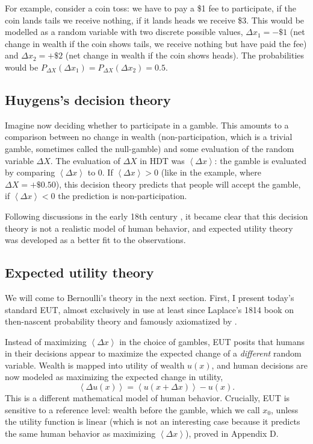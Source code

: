\documentclass[final]{ectaart}
\newcommand{\ave}[1]{\left\langle#1 \right\rangle}
\newcommand{\elabel}[1]{\label{eq:#1}}
\newcommand{\be}{\begin{equation}}
\newcommand{\ee}{\end{equation}}
\newcommand{\Dx}{{\Delta x}}
\newcommand{\DX}{{\Delta X}}
\newcommand{\Du}{\Delta u}
\theoremstyle{plain}
\begin{document}
For example, consider a coin toss: we have to pay a \$1 fee to participate, if the coin lands tails we receive nothing, if it lands heads we receive \$3. This would be modelled as a random variable with two discrete possible values, $\Dx_1=-\$1$ (net change in wealth if the coin shows tails, we receive nothing but have paid the fee) and $\Dx_2=+\$2$ (net change in wealth if the coin shows heads). The probabilities would be $P_\DX(\Dx_1)=P_\DX(\Dx_2)=0.5$.


\subsection{Huygens's decision theory}
Imagine now deciding whether to participate in a gamble. This amounts to a comparison between no change in wealth (non-participation, which is a trivial gamble, sometimes called the null-gamble) and some evaluation of the random variable $\DX$. The evaluation of $\DX$ in HDT was $\ave{\Dx}$: the gamble is evaluated by comparing $\ave{\Dx}$ to 0. If $\ave{\Dx}>0$ (like in the example, where $\DX=+\$0.50$), this decision theory predicts that people will accept the gamble, if $\ave{\Dx}<0$ the prediction is non-participation.

Following discussions in the early 18th century \cite[p.~402]{Montmort1713}, it became clear that this decision theory is not a realistic model of human behavior, and expected utility theory was developed as a better fit to the observations. 

\subsection{Expected utility theory}
We will come to Bernoulli's theory in the next section. First, I present today's standard EUT, almost exclusively in use at least since Laplace's 1814 book on then-nascent probability theory \citep{Laplace1814} and famously axiomatized by \citet{vonNeumannMorgenstern1944}.

Instead of maximizing $\ave{\Dx}$ in the choice of gambles, EUT posits that humans in their decisions appear to maximize the expected change of a {\it different} random variable. Wealth is mapped into utility of wealth $u(x)$, and human decisions are now modeled as maximizing the expected change in utility, 
\be
\ave{\Du(x)}=\ave{u(x+\Dx)}-u(x).
\elabel{EUT}
\ee
This is a different mathematical model of human behavior. Crucially, EUT is sensitive to a reference level: wealth before the gamble, which we call $x_0$, unless the utility function is linear (which is not an interesting case because it predicts the same human behavior as maximizing $\ave{\Dx}$), proved in Appendix D.
\end{document}
